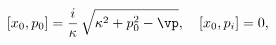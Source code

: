\begin{equation}\label{a.3}
   [x_0,p_0] = \frac{i}\kappa\, \sqrt{\kappa^2 +p_0^2-\vp}, \quad [x_0,p_i] = 0,
\end{equation}


